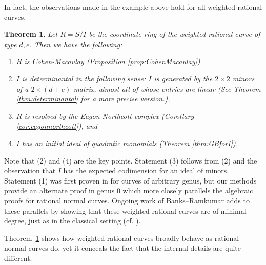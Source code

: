 \documentclass[12pt,reqno]{amsart}
\newtheorem{introtheorem}{Theorem}
\theoremstyle{definition}
\theoremstyle{remark}
\begin{document}
In fact, the observations made in the example above hold for all weighted rational curves.

\begin{introtheorem}
\label{thm:intro}
    Let $R = S/I$ be the coordinate ring of the weighted rational curve of type $d,e$.  Then we have the following:
    \begin{enumerate}
        \item $R$ is Cohen-Macaulay (Proposition \ref{prop:CohenMacaulay})
        \item $I$ is determinantal in the following sense:  $I$ is generated by the $2\times2$ minors of a $2 \times (d+e)$ matrix, almost all of whose entries are linear  (See Theorem \ref{thm:determinantal} for a more precise version.),
        \item $R$ is resolved by the Eagon-Northcott complex (Corollary \ref{cor:eagonnorthcott}), and
        \item $I$ has an initial ideal of quadratic monomials (Theorem \ref{thm:GBforI}). 
    \end{enumerate}
\end{introtheorem}

Note that (2) and (4) are the key points.  Statement (3) follows from (2) and the observation that $I$ has the expected codimension for an ideal of minors.  Statement (1) was first proven in \cite{beLinSyzOCurvesIWProjSp} for curves of arbitrary genus, but our methods provide an alternate proof in genus 0 which more closely parallels the algebraic proofs for rational normal curves. Ongoing work of Banks--Ramkumar adds to these parallels by showing that these weighted rational curves are of minimal degree, just as in the classical setting (cf. \cite[p. 341]{eSyzygiesDegreesChoices}).

Theorem~\ref{thm:intro} shows how weighted rational curves broadly behave as rational normal curves do, yet it conceals the fact that the internal details are quite different.
\end{document}

